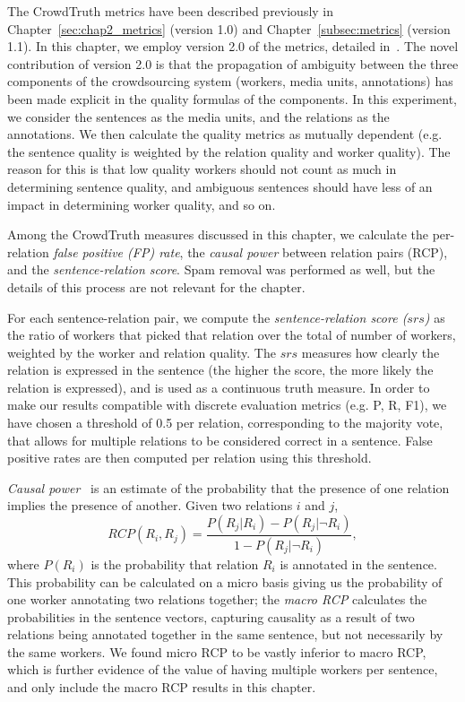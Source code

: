 {\color{blue} 
The CrowdTruth metrics have been described previously in Chapter~\ref{sec:chap2_metrics} (version 1.0) and Chapter~\ref{subsec:metrics} (version 1.1). In this chapter, we employ version 2.0 of the metrics, detailed in~\citet{dumitrache2018crowdtruth}. The novel contribution of version 2.0 is that the propagation of ambiguity between the three components of the crowdsourcing system (workers, media units, annotations) has been made explicit in the quality formulas of the components. In this experiment, we consider the sentences as the media units, and the relations as the annotations. We then calculate the quality metrics as mutually dependent (e.g. the sentence quality is weighted by the relation quality and worker quality). The reason for this is that low quality workers should not count as much in determining sentence quality, and ambiguous sentences should have less of an impact in determining worker quality, and so on.

Among the CrowdTruth measures discussed in this chapter, we calculate the per-relation \textit{false positive (FP) rate}, the \textit{causal power} between relation pairs (RCP), and the \textit{sentence-relation score}. Spam removal was performed as well, but the details of this process are not relevant for the chapter.
}

For each sentence-relation pair, we compute the \textit{sentence-relation score ($srs$)} as the ratio of workers that picked that relation over the total of number of workers, weighted by the worker and relation quality. The $srs$ measures how clearly the relation is expressed in the sentence (the higher the score, the more likely the relation is expressed), and is used as a continuous truth measure. In order to make our results compatible with discrete evaluation metrics (e.g. P, R, F1), we have chosen a threshold of 0.5 per relation, corresponding to the majority vote, that allows for multiple relations to be considered correct in a sentence.  False positive rates are then computed per relation using this threshold.

\textit{Causal power}~\cite{cheng1997causalpower} is an estimate of the probability that the presence of one relation implies the presence of another. Given two relations $i$ and $j$,
\begin{equation}
RCP(R_i, R_j) = \dfrac{P(R_{j} | R_{i} ) - P(R_{j}  | \neg R_{i} ) }{1 - P(R_{j} | \neg R_{i} )},
\end{equation}
where $P(R_{i})$ is the probability that relation $R_i$ is annotated in the sentence. This probability can be calculated on a micro basis giving us the probability of one worker annotating two relations together; the \textit{macro RCP} calculates the probabilities in the sentence vectors, capturing causality as a result of two relations being annotated together in the same sentence, but not necessarily by the same workers.  We found micro RCP to be vastly inferior to macro RCP, which is further evidence of the value of having multiple workers per sentence, and only include the macro RCP results in this chapter.


